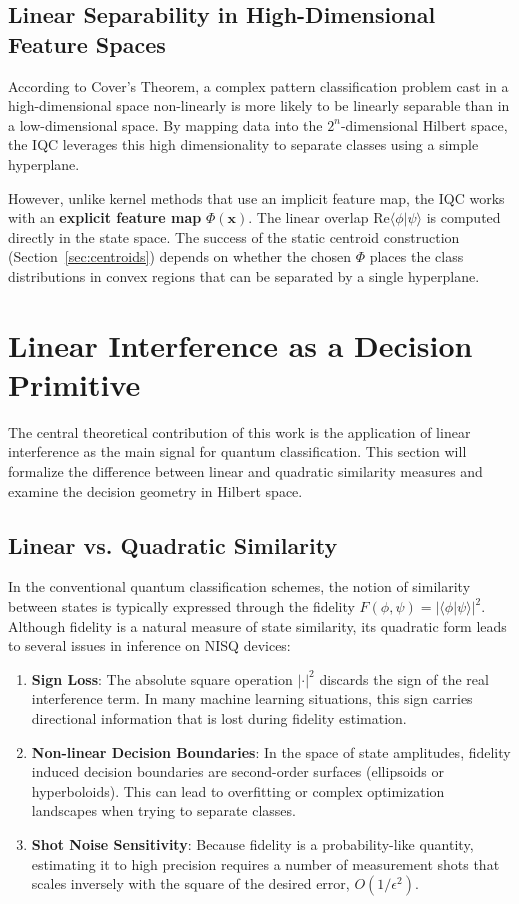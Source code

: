 \documentclass[conference]{IEEEtran}
\begin{document}
\subsection{Linear Separability in High-Dimensional Feature Spaces}

According to Cover's Theorem, a complex pattern classification problem cast in a high-dimensional space non-linearly is more likely to be linearly separable than in a low-dimensional space. By mapping data into the $2^n$-dimensional Hilbert space, the IQC leverages this high dimensionality to separate classes using a simple hyperplane.

However, unlike kernel methods that use an implicit feature map, the IQC works with an \textbf{explicit feature map} $\Phi(\mathbf{x})$. The linear overlap $\mathrm{Re}\langle \phi | \psi \rangle$ is computed directly in the state space. The success of the static centroid construction (Section~\ref{sec:centroids}) depends on whether the chosen $\Phi$ places the class distributions in convex regions that can be separated by a single hyperplane.

\section{Linear Interference as a Decision Primitive}

The central theoretical contribution of this work is the application of linear interference as the main signal for quantum classification. This section will formalize the difference between linear and quadratic similarity measures and examine the decision geometry in Hilbert space.

\subsection{Linear vs. Quadratic Similarity}

In the conventional quantum classification schemes, the notion of similarity between states is typically expressed through the fidelity $F(\phi, \psi) = |\langle \phi | \psi \rangle|^2$. Although fidelity is a natural measure of state similarity, its quadratic form leads to several issues in inference on NISQ devices:
\begin{enumerate}
    \item \textbf{Sign Loss}: The absolute square operation $|\cdot|^2$ discards the sign of the real interference term. In many machine learning situations, this sign carries directional information that is lost during fidelity estimation.
    \item \textbf{Non-linear Decision Boundaries}: In the space of state amplitudes, fidelity induced decision boundaries are second-order surfaces (ellipsoids or hyperboloids). This can lead to overfitting or complex optimization landscapes when trying to separate classes.
    \item \textbf{Shot Noise Sensitivity}: Because fidelity is a probability-like quantity, estimating it to high precision requires a number of measurement shots that scales inversely with the square of the desired error, $O(1/\epsilon^2)$.
\end{enumerate}
\end{document}
